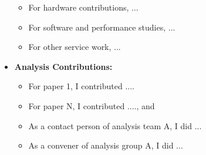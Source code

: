 \begin{itemize}
        \begin{itemize}
            \item For hardware contributions, ...
            \item For software and performance studies, ...
            \item For other service work, ...
        \end{itemize}
    
\item \textbf{Analysis Contributions:}

        \begin{itemize}
            \item For paper 1, I contributed .... 
            \item For paper N, I contributed ...., and %
            \item As a contact person of analysis team A, I did ...
            \item As a convener of analysis group A, I did ...
        \end{itemize}

\end{itemize}
